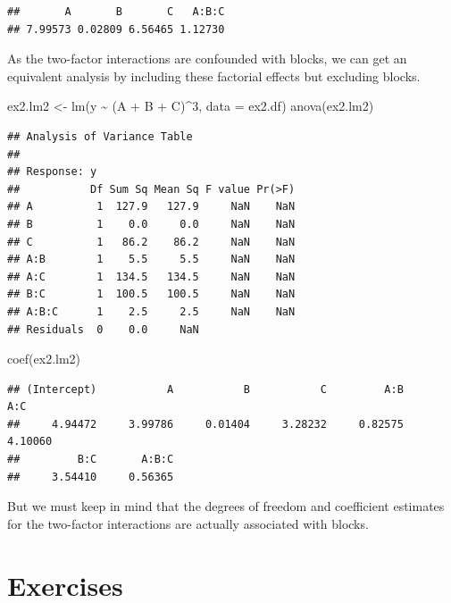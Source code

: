 \documentclass[
]{book}
\newenvironment{Shaded}{\begin{snugshade}}{\end{snugshade}}
\newcommand{\AttributeTok}[1]{\textcolor[rgb]{0.77,0.63,0.00}{#1}}
\newcommand{\DecValTok}[1]{\textcolor[rgb]{0.00,0.00,0.81}{#1}}
\newcommand{\FunctionTok}[1]{\textcolor[rgb]{0.00,0.00,0.00}{#1}}
\newcommand{\NormalTok}[1]{#1}
\newcommand{\OtherTok}[1]{\textcolor[rgb]{0.56,0.35,0.01}{#1}}
\newcommand{\SpecialCharTok}[1]{\textcolor[rgb]{0.00,0.00,0.00}{#1}}
\theoremstyle{definition}
\theoremstyle{definition}
\theoremstyle{definition}
\theoremstyle{definition}
\theoremstyle{remark}
\begin{document}
\begin{verbatim}
##       A       B       C   A:B:C 
## 7.99573 0.02809 6.56465 1.12730
\end{verbatim}

As the two-factor interactions are confounded with blocks, we can get an equivalent analysis by including these factorial effects but excluding blocks.

\begin{Shaded}
\begin{Highlighting}[]
\NormalTok{ex2.lm2 }\OtherTok{\textless{}{-}} \FunctionTok{lm}\NormalTok{(y }\SpecialCharTok{\textasciitilde{}}\NormalTok{  (A }\SpecialCharTok{+}\NormalTok{ B }\SpecialCharTok{+}\NormalTok{ C)}\SpecialCharTok{\^{}}\DecValTok{3}\NormalTok{, }\AttributeTok{data =}\NormalTok{ ex2.df)}
\FunctionTok{anova}\NormalTok{(ex2.lm2)}
\end{Highlighting}
\end{Shaded}

\begin{verbatim}
## Analysis of Variance Table
## 
## Response: y
##           Df Sum Sq Mean Sq F value Pr(>F)
## A          1  127.9   127.9     NaN    NaN
## B          1    0.0     0.0     NaN    NaN
## C          1   86.2    86.2     NaN    NaN
## A:B        1    5.5     5.5     NaN    NaN
## A:C        1  134.5   134.5     NaN    NaN
## B:C        1  100.5   100.5     NaN    NaN
## A:B:C      1    2.5     2.5     NaN    NaN
## Residuals  0    0.0     NaN
\end{verbatim}

\begin{Shaded}
\begin{Highlighting}[]
\FunctionTok{coef}\NormalTok{(ex2.lm2)}
\end{Highlighting}
\end{Shaded}

\begin{verbatim}
## (Intercept)           A           B           C         A:B         A:C 
##     4.94472     3.99786     0.01404     3.28232     0.82575     4.10060 
##         B:C       A:B:C 
##     3.54410     0.56365
\end{verbatim}

But we must keep in mind that the degrees of freedom and coefficient estimates for the two-factor interactions are actually associated with blocks.

\hypertarget{exercises-4}{%
\section{Exercises}\label{exercises-4}}
\end{document}
